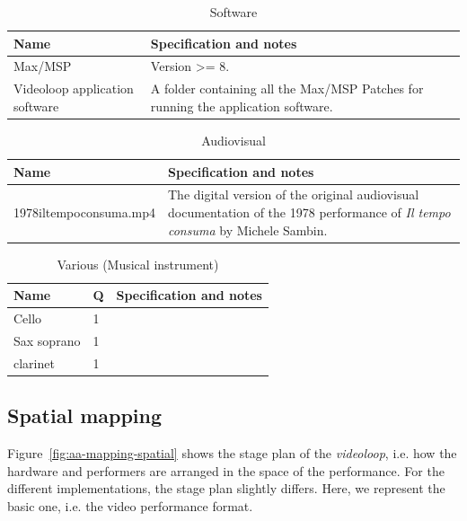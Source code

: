 \begin{longtable}{|p{}|p{}|}
    \caption{Software} \label{tab:a-data-software} \\
    \hline
    \textbf{Name} & \textbf{Specification and notes} \\
    \hline
    Max/MSP & \scriptsize Version >= 8. \\
    \hline
    Videoloop application software & \scriptsize A folder containing all the Max/MSP Patches for running the application software. \\
    \hline
\end{longtable}

\begin{longtable}{|p{}|p{}|}
    \caption{Audiovisual} \label{tab:a-data-audiovisual} \\
    \hline
    \textbf{Name} & \textbf{Specification and notes} \\
    \hline
    1978iltempoconsuma.mp4 & \scriptsize The digital version of the original audiovisual documentation of the 1978 performance of \textit{Il tempo consuma} by Michele Sambin. \\
    \hline
\end{longtable}

\begin{longtable}{|p{}|p{}|p{}|}
    \caption{Various (Musical instrument)} \label{tab:a-data-various} \\
    \hline
    \textbf{Name} & \textbf{Q} & \textbf{Specification and notes} \\
    \hline
    Cello & 1 & \scriptsize \\
    \hline
    Sax soprano & 1 & \scriptsize \\
    \hline
    clarinet & 1 & \scriptsize \\
    \hline
\end{longtable}

\subsection*{Spatial mapping}
Figure~\ref{fig:aa-mapping-spatial} shows the stage plan of the \textit{videoloop}, i.e. how the hardware and performers are arranged in the space of the performance. For the different implementations, the stage plan slightly differs. Here, we represent the basic one, i.e. the video performance format.

